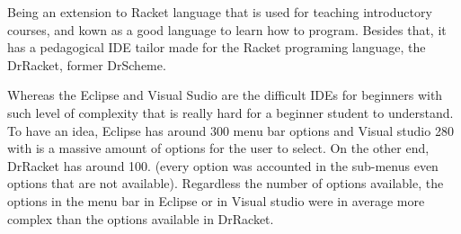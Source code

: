 Being an extension to Racket language that is used for teaching introductory courses,
and kown as a good language to learn how to program.
Besides that, it has a pedagogical IDE tailor made for the Racket programing language,
the DrRacket, former DrScheme. %



Whereas the Eclipse and Visual Sudio are the difficult IDEs for beginners with such level of
complexity that is really hard for a beginner student to understand.
To have an idea, Eclipse has around 300 menu bar options and Visual studio 280 with is a massive amount
of options for the user to select. On the other end, DrRacket has around 100. (every option was accounted in the sub-menus
even options that are not available). Regardless the number of options available,
the options in the menu bar in Eclipse or in Visual studio were in average more complex than the
options available in DrRacket.



